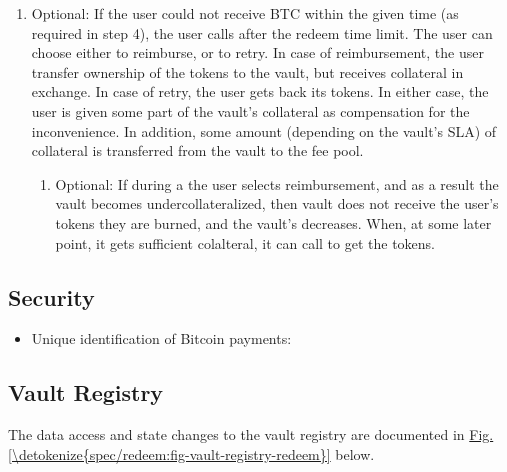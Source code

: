 \documentclass[a4paper,10pt,english]{sphinxmanual}
\begin{document}
\begin{enumerate}
\item {} 
Optional: If the user could not receive BTC within the given time (as required in step 4), the user calls {\hyperref[\detokenize{spec/redeem:cancelredeem}]{}} after the redeem time limit. The user can choose either to reimburse, or to retry. In case of reimbursement, the user transfer ownership of the tokens to the vault, but receives collateral in exchange. In case of retry, the user gets back its tokens. In either case, the user is given some part of the vault’s collateral as compensation for the inconvenience. In addition, some amount (depending on the vault’s SLA) of collateral is transferred from the vault to the fee pool.
\begin{enumerate}
%
\item {} 
Optional: If during a {\hyperref[\detokenize{spec/redeem:cancelredeem}]{}} the user selects reimbursement, and as a result the vault becomes undercollateralized, then vault does not receive the user’s tokens \sphinxhyphen{} they are burned, and the vault’s  decreases. When, at some later point, it gets sufficient colalteral, it can call {\hyperref[\detokenize{spec/redeem:minttokensforreimbursedredeem}]{}} to get the tokens.

\end{enumerate}

\end{enumerate}


\subsection{Security}
\label{\detokenize{spec/redeem:security}}\begin{itemize}
\item {} 
Unique identification of Bitcoin payments: {\hyperref[\detokenize{security_performance/security-analysis:op-return}]{}}

\end{itemize}


\subsection{Vault Registry}
\label{\detokenize{spec/redeem:vault-registry}}
The data access and state changes to the vault registry are documented in \hyperref[\detokenize{spec/redeem:fig-vault-registry-redeem}]{Fig.\@ \ref{\detokenize{spec/redeem:fig-vault-registry-redeem}}} below.
\end{document}
